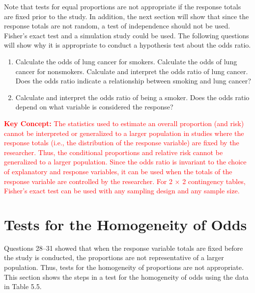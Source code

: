 \documentclass[
]{report}
\providecommand{\tightlist}{%
  \setlength{\itemsep}{0pt}\setlength{\parskip}{0pt}}
\begin{document}
Note that tests for equal proportions are not appropriate if the response totals are fixed prior to the study. In addition, the next section will show that since the response totals are not random, a test of independence should not be used. Fisher's exact test and a simulation study could be used. The following questions will show why it is appropriate to conduct a hypothesis test about the odds ratio.

\begin{enumerate}
\def\labelenumi{\arabic{enumi}.}
\setcounter{enumi}{29}
\tightlist
\item
  Calculate the odds of lung cancer for smokers. Calculate the odds of lung cancer for nonsmokers. Calculate and interpret the odds ratio of lung cancer. Does the odds ratio indicate a relationship between smoking and lung cancer?\\
\item
  Calculate and interpret the odds ratio of being a smoker. Does the odds ratio depend on what variable is considered the response?
\end{enumerate}

\Large

\textbf{\textcolor{red}{Key Concept:}}
\textcolor{red}{The statistics used to estimate an overall proportion (and risk) cannot be interpreted or generalized to a larger population in studies where the response totals (i.e., the distribution of the response variable) are fixed by the researcher. Thus, the conditional proportions and relative risk cannot be generalized to a larger population. Since the odds ratio is invariant to the choice of explanatory and response variables, it can be used when the totals of the response variable are controlled by the researcher. For 2 × 2 contingency tables, Fisher’s exact test can be used with any sampling design and any sample size.}
\normalsize

\hypertarget{tests-for-the-homogeneity-of-odds}{%
\section*{Tests for the Homogeneity of Odds}\label{tests-for-the-homogeneity-of-odds}}

Questions 28--31 showed that when the response variable totals are fixed before the study is conducted, the proportions are not representative of a larger population. Thus, tests for the homogeneity of proportions are not appropriate. This section shows the steps in a test for the homogeneity of odds using the data in Table 5.5.
\end{document}
